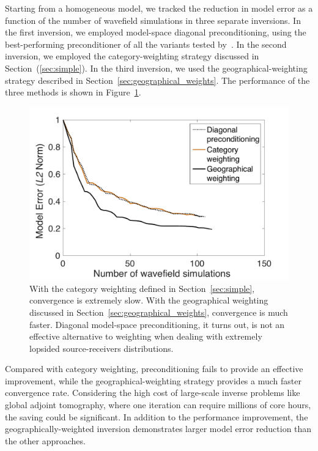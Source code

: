 Starting from a homogeneous model, we tracked the reduction in model error as a function of the number of wavefield simulations in three separate inversions.
In the first inversion, we employed model-space diagonal preconditioning, using the best-performing preconditioner of all the variants tested by~\cite{Modrak2016}.
In the second inversion, we employed the category-weighting 
strategy discussed in Section~(\ref{sec:simple}).  
 In the third inversion, we used the geographical-weighting strategy described in Section~\ref{sec:geographical_weights}. The performance of the three methods is shown in Figure~\ref{fig:convergence}. 

\begin{figure}
    \centering
    \begin{minipage}[t]{.9\columnwidth}
    \includegraphics[width=.8\textwidth]{ch-weighting/figures/convergence_tests.pdf}  %
    \end{minipage}
\caption{\small{With the category weighting defined in Section~\ref{sec:simple}, convergence is extremely slow.  
With the geographical weighting discussed in Section~\ref{sec:geographical_weights}, convergence is much faster.  
Diagonal model-space preconditioning, it turns out, is not an effective alternative to weighting when dealing with extremely lopsided source-receivers distributions.
}}
\label{fig:convergence}
\end{figure}

Compared with category weighting, preconditioning fails to provide an effective improvement, while the geographical-weighting 
strategy provides a much faster convergence rate. Considering the high cost of large-scale inverse problems 
like global adjoint tomography, where one iteration can require  millions of core hours, 
the saving could be significant. In addition to the performance improvement, the geographically-weighted inversion 
 demonstrates larger model error reduction than the other  approaches. 
%
%
